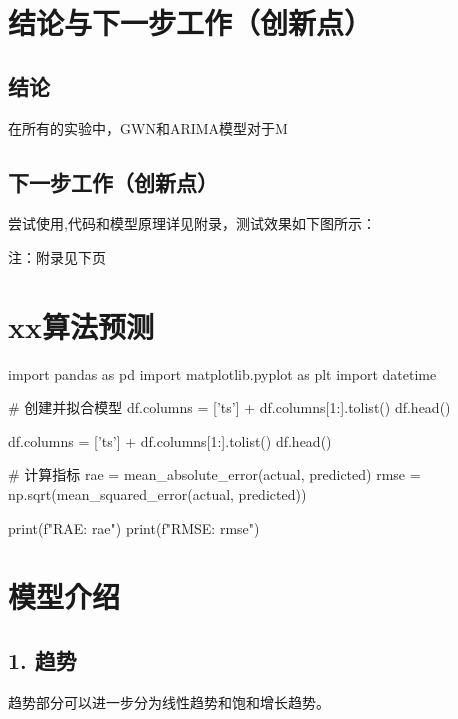 \documentclass[4pt]{article}
\begin{document}
\section{结论与下一步工作（创新点）}

\subsection{结论}

在所有的实验中，GWN和ARIMA模型对于M
\subsection{下一步工作（创新点）}

尝试使用,代码和模型原理详见附录，测试效果如下图所示：

注：附录见下页
\newpage
\appendix
\section{xx算法预测}
 \begin{python}
import pandas as pd
import matplotlib.pyplot as plt
import datetime

# 创建并拟合模型
df.columns = ['ts'] + df.columns[1:].tolist()
df.head()

df.columns = ['ts'] + df.columns[1:].tolist()
df.head()

# 计算指标
rae = mean_absolute_error(actual, predicted)
rmse = np.sqrt(mean_squared_error(actual, predicted))

print(f"RAE: {rae}")
print(f"RMSE: {rmse}")
\end{python}

\section*{模型介绍}

\subsection*{1. 趋势}

趋势部分可以进一步分为线性趋势和饱和增长趋势。

\end{document}
